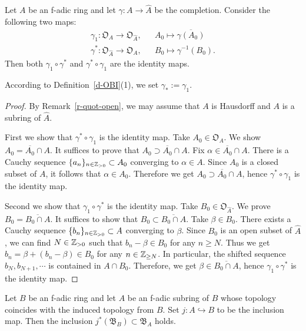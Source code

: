 \begin{lem}\label{l-complete-open}
Let $A$ be an f-adic ring and 
let $\gamma:A \to \widehat{A}$ be the completion. 
Consider the following two maps: 
\begin{eqnarray*}
\gamma_1:\mathfrak O_{A} \to \mathfrak O_{\widehat{A}},&& 
A_0 \mapsto \overline{\gamma(A_0)}\\
\gamma^*:\mathfrak O_{\widehat{A}} \to \mathfrak O_{A},&& 
B_0 \mapsto \gamma^{-1}(B_0).
\end{eqnarray*}
Then both $\gamma_1 \circ \gamma^*$ and $\gamma^*\circ \gamma_1$ are 
the identity maps. 
\end{lem}

According to Definition~\ref{d-OBI}(1), we set $\gamma_*:=\gamma_1$. 

\begin{proof}
By Remark~\ref{r-quot-open}, 
we may assume that $A$ is Hausdorff and 
$A$ is a subring of $\widehat{A}$. 

First we show that $\gamma^* \circ \gamma_1$ is the identity map. 
Take $A_0 \in \mathfrak O_{A}$. 
We show $A_0=\overline{A_0} \cap A$. 
It suffices to prove that $A_0 \supset \overline{A_0} \cap A$. 
Fix $\alpha \in \overline{A_0} \cap A$. 
There is a Cauchy sequence 
$\{a_n\}_{n \in \mathbb{Z}_{>0}} \subset A_0$ converging to $\alpha \in A$. 
Since $A_0$ is a closed subset of $A$, it follows that $\alpha \in A_0$. 
Therefore we get $A_0 \supset \overline{A_0} \cap A$, 
hence $\gamma^* \circ \gamma_1$ is the identity map. 



Second we show that $\gamma_1 \circ \gamma^*$ is the identity map. 
Take $B_0 \in \mathfrak O_{\widehat{A}}$. 
We prove $B_0=\overline{B_0 \cap A}$. 
It suffices to show that $B_0 \subset \overline{B_0 \cap A}$. 
Take $\beta \in B_0$. 
There exists a Cauchy sequence 
$\{b_n\}_{n \in \mathbb{Z}_{>0}} \subset A$ converging to $\beta$. 
Since $B_0$ is an open subset of $\widehat{A}$, we can find $N \in \mathbb{Z}_{>0}$ 
such that $b_n-\beta \in B_0$ for any $n \geq  N$. 
Thus we get $b_n=\beta+(b_n-\beta) \in B_0$ for any $n \in \mathbb{Z}_{\geq N}$. 
In particular, the shifted sequence $b_N, b_{N+1}, \cdots$ 
is contained in $A \cap B_0$. 
Therefore, we get $\beta \in \overline{B_0 \cap A}$, 
hence $\gamma_1 \circ \gamma^*$ is the identity map. 
\end{proof}


\begin{lem}\label{l-sub-bdd-bdd}
Let $B$ be an f-adic ring and 
let $A$ be an f-adic subring of $B$ 
whose topology coincides with the induced topology from $B$. 
Set $j:A \hookrightarrow B$ to be the inclusion map. 
Then the inclusion 
$j^*(\mathfrak B_{B}) \subset \mathfrak B_{A}$ holds. 
\end{lem}

